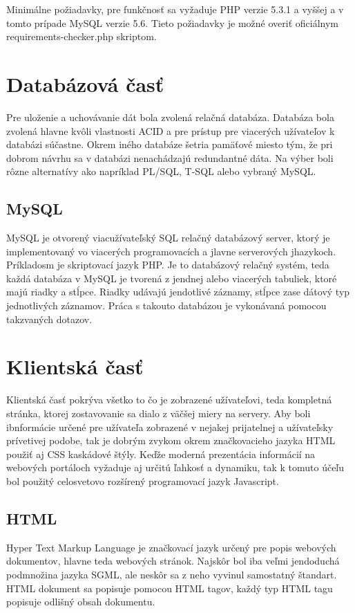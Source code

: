 Minimálne požiadavky, pre funkčnosť sa vyžaduje PHP verzie 5.3.1 a vyššej a v tomto prípade MySQL verzie 5.6. Tieto požiadavky je možné overiť oficiálnym requirements-checker.php skriptom.


\section{Databázová časť}
\label{sec:databaza}
Pre uloženie a uchovávanie dát bola zvolená relačná databáza. Databáza bola zvolená hlavne kvôli vlastnosti ACID a pre prístup pre viacerých užívateľov k databázi súčastne. Okrem iného databáze šetria pamäťové miesto tým, že pri dobrom návrhu sa v databázi nenachádzajú redundantné dáta. Na výber boli rôzne alternatívy ako napríklad PL/SQL, T-SQL alebo vybraný MySQL.  

\subsection{MySQL}
\label{sec:mysql}
MySQL je otvorený viacužívateľský SQL relačný databázový server, ktorý je implementovaný vo viacerých programovacích a jlavne serverových jhazykoch. Príkladosm je skriptovací jazyk PHP. Je to databázový relačný systém, teda každá databáza v MySQL je tvorená z jendnej alebo viacerých tabuliek, ktoré majú riadky a stĺpce. Riadky udávajú jendotlivé záznamy, stĺpce zase dátový typ jednotlivých záznamov. Práca s takouto databázou je vykonávaná pomocou takzvaných dotazov.

\section{Klientská časť}
\label{sec:klient}
Klientská časť pokrýva všetko to čo je zobrazené užívateľovi, teda kompletná stránka, ktorej zostavovanie sa dialo z väčšej miery na servery. Aby boli ibnformácie určené pre užívateľa zobrazené v nejakej prijatelnej a užívateľsky prívetivej podobe, tak je dobrým zvykom okrem značkovacieho jazyka HTML použiť aj CSS kaskádové štýly. Keďže moderná prezentácia informácií na webových portáloch vyžaduje aj určitú ľahkosť a dynamiku, tak k tomuto účeľu bol použitý celosvetovo rozšírený programovací jazyk Javascript.

\subsection{HTML}
\label{sec:html}
Hyper Text Markup Language je značkovací jazyk určený pre popis webových dokumentov, hlavne teda webových stránok. Najskôr bol iba veľmi jendoduchá podmnožina jazyka SGML, ale neskôr sa z neho vyvinul samostatný štandart. HTML dokument sa popisuje pomocou HTML tagov, každý typ HTML tagu popisuje odlišný obsah dokumentu.  

